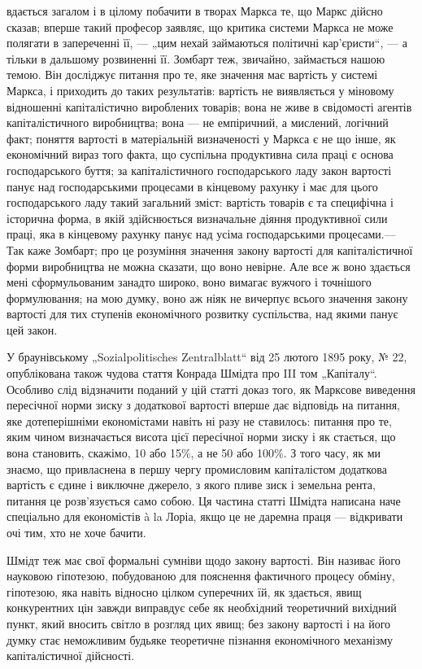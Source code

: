\parcont{}  %
вдається загалом і в цілому побачити в творах Маркса те, що Маркс дійсно сказав; вперше такий професор заявляє, що
критика системи Маркса не може полягати в запереченні її, — „цим нехай займаються політичні кар’єристи“, — а тільки
в дальшому
розвиненні її. Зомбарт теж, звичайно, займається нашою темою. Він досліджує питання про те, яке значення має
вартість у
системі Маркса, і приходить до таких результатів: вартість не виявляється у міновому відношенні капіталістично
вироблених товарів; вона не живе в свідомості агентів капіталістичного виробництва; вона — не емпіричний, а
мислений,
логічний факт; поняття вартості в матеріальній визначеності у Маркса є не що інше, як економічний вираз того факта,
що
суспільна продуктивна сила праці є основа господарського буття; за капіталістичного господарського ладу закон
вартості панує
над господарськими процесами в кінцевому рахунку і має для цього господарського ладу такий загальний зміст:
вартість товарів
є та специфічна і історична форма, в якій здійснюється визначальне діяння продуктивної сили праці, яка в кінцевому
рахунку
панує над усіма господарськими процесами.— Так каже Зомбарт; про це розуміння значення закону вартості для
капіталістичної
форми виробництва не можна сказати, що воно невірне. Але все ж воно здається мені сформульованим занадто широко,
воно
вимагає вужчого і точнішого формулювання; на мою думку, воно аж ніяк не вичерпує всього значення закону вартості
для тих
ступенів економічного розвитку суспільства, над якими панує цей закон.

У браунівському „Sozialpolitisches Zentralblatt“ від
25 лютого 1895 року, № 22, опублікована також чудова стаття Конрада Шмідта про III том „Капіталу“. Особливо слід відзначити
поданий у цій статті доказ того, як Марксове виведення пересічної норми зиску з додаткової вартості вперше дає відповідь на
питання, яке дотеперішніми економістами навіть ні разу не ставилось:  питання про те, яким чином визначається висота цієї
пересічної норми зиску і як стається, що вона становить, скажімо, 10 або 15\%, а не 50 або 100\%. З того часу, як ми
знаємо, що привласнена в першу чергу промисловим капіталістом додаткова вартість є єдине і виключне джерело, з якого пливе
зиск і земельна рента, питання це розв’язується само собою. Ця частина статті Шмідта написана наче спеціально для
економістів à la Лоріа, якщо це не даремна праця — відкривати очі тим, хто не хоче бачити.

Шмідт теж має свої формальні
сумніви щодо закону вартості. Він називає його науковою гіпотезою, побудованою для пояснення фактичного процесу обміну,
гіпотезою, яка навіть відносно цілком суперечних їй, як здається, явищ конкурентних цін завжди виправдує себе як необхідний
теоретичний вихідний пункт, який вносить світло в розгляд цих явищ; без закону вартості і на його думку стає неможливим
будьяке теоретичне пізнання економічного механізму капіталістичної дійсності.
\parbreak{}  %

